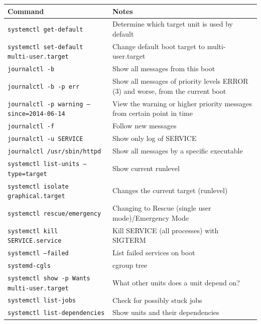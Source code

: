 \documentclass[a4paper]{article}
\begin{document}
\begin{center}
\vspace{6mm}

\begin{tabularx}{\textwidth}{ |l|X| }
\hline
\rowcolor[gray]{.8}
\bfseries Command                                       & \bfseries Notes \\\hline
\tt systemctl get-default                               & Determine which target unit is used by default \\\hline
\tt systemctl set-default multi-user.target             & Change default boot target to multi-user.target \\\hline
\tt journalctl -b                                       & Show all messages from this boot \\\hline
\tt journalctl -b -p err                                & Show all messages of priority levels ERROR (3) and worse, from the current boot \\\hline
\tt journalctl -p warning --since=2014-06-14            & View the warning or higher priority messages from certain point in time \\\hline
\tt journalctl -f                                       & Follow new messages \\\hline
\tt journalctl -u SERVICE                               & Show only log of SERVICE \\\hline
\tt journalctl /usr/sbin/httpd                          & Show all messages by a specific executable \\\hline
\tt systemctl list-units --type=target                  & Show current runlevel \\\hline
\tt systemctl isolate graphical.target                  & Changes the current target (runlevel) \\\hline
\tt systemctl rescue/emergency                          & Changing to Rescue (single user mode)/Emergency Mode \\\hline
\tt systemctl kill SERVICE.service                      & Kill SERVICE (all processes) with SIGTERM \\\hline
\tt systemctl --failed                                  & List failed services on boot \\\hline
\tt systemd-cgls                                        & cgroup tree \\\hline
\tt systemctl show -p Wants multi-user.target           & What other units does a unit depend on? \\\hline
\tt systemctl list-jobs                                 & Check for possibly stuck jobs \\\hline
\tt systemctl list-dependencies                         & Show units and their dependencies \\\hline
\end{tabularx}


\end{center}
\end{document}
